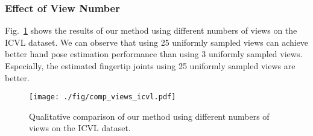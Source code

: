\documentclass[letterpaper]{article} \usepackage{aaai22}  \usepackage{times}  \usepackage{helvet}  \usepackage{courier}  \usepackage[hyphens]{url}  \usepackage{graphicx} \urlstyle{rm} \def\UrlFont{\rm}  \usepackage{natbib}  \usepackage{caption} \DeclareCaptionStyle{ruled}{labelfont=normalfont,labelsep=colon,strut=off} \frenchspacing  \setlength{\pdfpagewidth}{8.5in}  \setlength{\pdfpageheight}{11in}  \usepackage{algorithm}
\begin{document}
\subsubsection{Effect of View Number}
Fig.~\ref{fig:comp_views} shows the results of our method using different numbers of views on the ICVL dataset.
We can observe that using 25 uniformly sampled views can achieve better hand pose estimation performance than using 3 uniformly sampled views. Especially, the estimated fingertip joints using 25 uniformly sampled views are better. 

\begin{figure}[ht]
\centering 
\texttt{[image: ./fig/comp\_views\_icvl.pdf]}
\caption{Qualitative comparison of our method using different numbers of views on the ICVL dataset.}
\vspace{45em}
\label{fig:comp_views}
\end{figure}

 
\end{document}
